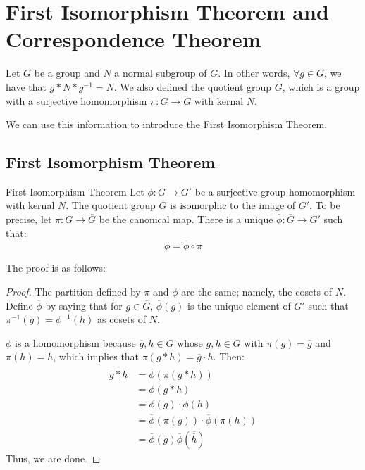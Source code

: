 \documentclass[letterpaper]{article}
\begin{document}
\newpage 
\section{First Isomorphism Theorem and Correspondence Theorem}
Let $G$ be a group and $N$ a normal subgroup of $G$. In other words, $\forall g \in G$, we have that $g * N * g^{-1} = N$. We also defined the quotient group $\overline{G}$, which is a group with a surjective homomorphism $\pi: G \to \overline{G}$ with kernal $N$.

\bigskip 

We can use this information to introduce the First Isomorphism Theorem. 

\subsection{First Isomorphism Theorem}
\begin{theorem}{First Isomorphism Theorem}{}
    Let $\phi: G \to G'$ be a surjective group homomorphism with kernal $N$. The quotient group $\overline{G}$ is isomorphic to the image of $G'$. To be precise, let $\pi: G \to \overline{G}$ be the canonical map. There is a unique $\overline{\phi}: \overline{G} \to G'$ such that:
    \[\phi = \overline{\phi} \circ \pi\] 
\end{theorem}
The proof is as follows: 
\begin{mdframed}
    \begin{proof}
        The partition defined by $\pi$ and $\phi$ are the same; namely, the cosets of $N$. Define $\overline{\phi}$ by saying that for $\overline{g} \in \overline{G}$, $\overline{\phi}(\overline{g})$ is the unique element of $G'$ such that $\pi^{-1}(\overline{g}) = \phi^{-1}(h)$ as cosets of $N$. 

        \bigskip 

        $\overline{\phi}$ is a homomorphism because $\overline{g}, \overline{h} \in \overline{G}$ whose $g, h \in G$ with $\pi(g) = \overline{g}$ and $\pi(h) = \overline{h}$, which implies that $\pi(g * h) = \overline{g} \cdot \overline{h}$. Then: 
        \begin{equation*}
            \begin{aligned}
                \overline{\overline{g} * \overline{h}} &= \overline{\phi}(\pi(g * h)) \\ 
                    &= \phi(g * h) \\ 
                    &= \phi(g) \cdot \phi(h) \\ 
                    &= \overline{\phi}(\pi(g)) \cdot \overline{\phi}(\pi(h)) \\ 
                    &= \overline{\phi}(\overline{g}) \overline{\phi}(\overline{\overline{h}})
            \end{aligned}
        \end{equation*} 
        Thus, we are done. 
    \end{proof}
\end{mdframed}
\end{document}
